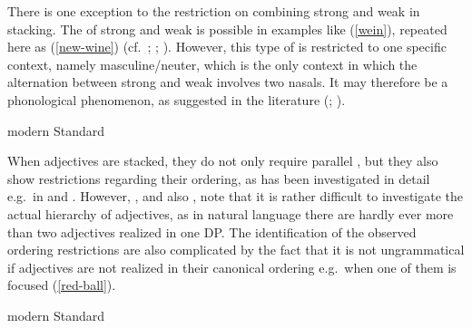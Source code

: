 \documentclass[output=paper,colorlinks,citecolor=brown]{langscibook}
\begin{document}
There is one exception to the restriction on combining strong and weak  in stacking. The  of strong and weak  is possible in examples like (\ref{wein}), repeated here as (\ref{new-wine}) (cf.~\citealp{Bildhauer2019}; \citealp{Peter2013}; \citealp{Sahel2021}). However, this type of  is restricted to one specific context, namely  masculine/neuter, which is the only context in which the alternation between strong and weak  involves two nasals. It may therefore be a phonological phenomenon, as suggested in the literature (\citealp{Roehrs2009}; \citealp{Sahel2021}).

\ea modern Standard  \label{new-wine}
\z
\z 

When adjectives are stacked, they do not only require parallel , but they also show restrictions regarding their ordering, as has been investigated in detail e.g.~in \citet{Scott2002} and \citet{eichinger1991ganz}. However, \citet[313]{eichinger1991ganz}, and also \citet[134]{MunzbergBildhauer2020}, note that it is rather difficult to investigate the actual hierarchy of adjectives, as in natural language there are hardly ever more than two  adjectives realized in one DP. The identification of the observed ordering restrictions are also complicated by the fact that it is not ungrammatical if adjectives are not realized in their canonical ordering e.g.~when one of them is focused (\ref{red-ball}).

\ea modern Standard  \label{red-ball}
\z
\z
\end{document}
